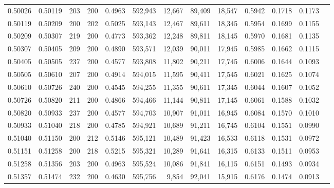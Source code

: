 \begin{tabular}{rrrrrrrrrrrrr}
0.50026 & 0.50119 &    203 & 200 &                                     0.4963 & 592,943 &  12,667 &  89,409 &  18,547 & 0.5942 & 0.1718 & 0.1173 \\
0.50119 & 0.50209 &    200 & 202 &                                     0.5025 & 593,143 &  12,467 &  89,611 &  18,345 & 0.5954 & 0.1699 & 0.1155 \\
0.50209 & 0.50307 &    219 & 200 &                                     0.4773 & 593,362 &  12,248 &  89,811 &  18,145 & 0.5970 & 0.1681 & 0.1135 \\
0.50307 & 0.50405 &    209 & 200 &                                     0.4890 & 593,571 &  12,039 &  90,011 &  17,945 & 0.5985 & 0.1662 & 0.1115 \\
0.50405 & 0.50505 &    237 & 200 &                                     0.4577 & 593,808 &  11,802 &  90,211 &  17,745 & 0.6006 & 0.1644 & 0.1093 \\
0.50505 & 0.50610 &    207 & 200 &                                     0.4914 & 594,015 &  11,595 &  90,411 &  17,545 & 0.6021 & 0.1625 & 0.1074 \\
0.50610 & 0.50726 &    240 & 200 &                                     0.4545 & 594,255 &  11,355 &  90,611 &  17,345 & 0.6044 & 0.1607 & 0.1052 \\
0.50726 & 0.50820 &    211 & 200 &                                     0.4866 & 594,466 &  11,144 &  90,811 &  17,145 & 0.6061 & 0.1588 & 0.1032 \\
0.50820 & 0.50933 &    237 & 200 &                                     0.4577 & 594,703 &  10,907 &  91,011 &  16,945 & 0.6084 & 0.1570 & 0.1010 \\
0.50933 & 0.51040 &    218 & 200 &                                     0.4785 & 594,921 &  10,689 &  91,211 &  16,745 & 0.6104 & 0.1551 & 0.0990 \\
0.51040 & 0.51150 &    200 & 212 &                                     0.5146 & 595,121 &  10,489 &  91,423 &  16,533 & 0.6118 & 0.1531 & 0.0972 \\
0.51151 & 0.51258 &    200 & 218 &                                     0.5215 & 595,321 &  10,289 &  91,641 &  16,315 & 0.6133 & 0.1511 & 0.0953 \\
0.51258 & 0.51356 &    203 & 200 &                                     0.4963 & 595,524 &  10,086 &  91,841 &  16,115 & 0.6151 & 0.1493 & 0.0934 \\
0.51357 & 0.51474 &    232 & 200 &                                     0.4630 & 595,756 &   9,854 &  92,041 &  15,915 & 0.6176 & 0.1474 & 0.0913 \\

\end{tabular}
